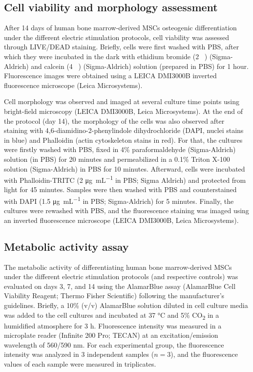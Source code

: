 \subsection{Cell viability and morphology assessment} 
After 14 days of human bone marrow-derived \ac{MSCs} osteogenic differentiation under the different electric stimulation protocols, cell viability was assessed through LIVE/DEAD staining. Briefly, cells were first washed with \ac{PBS}, after which they were incubated in the dark with ethidium bromide (2 \si{\micro\molar}) (Sigma-Aldrich) and calcein (4 \si{\micro\molar}) (Sigma-Aldrich) solution (prepared in \ac{PBS}) for 1 hour. Fluorescence images were obtained using a LEICA DMI3000B inverted fluorescence microscope (Leica Microsystems). 

Cell morphology was observed and imaged at several culture time points using bright-field microscopy (LEICA DMI3000B, Leica Microsystems). At the end of the protocol (day 14), the morphology of the cells was also observed after staining with 4,6-diamidino-2-phenylindole dihydrochloride (DAPI, nuclei stains in blue) and Phalloidin (actin cytoskeleton stains in red). For that, the cultures were firstly washed with \ac{PBS}, fixed in 4\si{\percent} paraformaldehyde (Sigma-Aldrich) solution (in \ac{PBS}) for 20 minutes and permeabilized in a 0.1\si{\percent} Triton X-100 solution (Sigma-Aldrich) in \ac{PBS} for 10 minutes. Afterward, cells were incubated with Phalloidin-TRITC (2 \si{\micro\gram\per\milli\liter} in PBS; Sigma Aldrich) and protected from light for 45 minutes. Samples were then washed with \ac{PBS} and counterstained with DAPI (1.5 \si{\micro\gram\per\milli\liter} in \ac{PBS}; Sigma-Aldrich) for 5 minutes. Finally, the cultures were rewashed with PBS, and the fluorescence staining was imaged using an inverted fluorescence microscope (LEICA DMI3000B, Leica Microsystems). 

\subsection{Metabolic activity assay} 
The metabolic activity of differentiating human bone marrow-derived \ac{MSCs} under the different electric stimulation protocols (and respective controls) was evaluated on days 3, 7, and 14 using the AlamarBlue assay (AlamarBlue Cell Viability Reagent; Thermo Fisher Scientific) following the manufacturer’s guidelines. Briefly, a 10\si{\percent} (v/v) AlamarBlue solution diluted in cell culture media was added to the cell cultures and incubated at 37 \si{\celsius} and 5\si{\percent} CO\textsubscript{2} in a humidified atmosphere for 3 \si{\hour}. Fluorescence intensity was measured in a microplate reader (Infinite 200 Pro; TECAN) at an excitation/emission wavelength of 560/590 \si{\nano\meter}. For each experimental group, the fluorescence intensity was analyzed in 3 independent samples ($n=3$), and the fluorescence values of each sample were measured in triplicates. 

